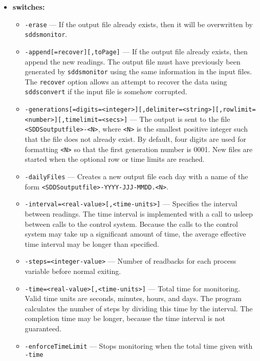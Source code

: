 \begin{itemize}
%
\item {\bf switches:}
%
%
    \begin{itemize}
        \item {\tt -erase} --- If the output file already exists, then it will be overwritten
                by \verb+sddsmonitor+.
        \item {\tt -append[=recover][,toPage]} --- If the output file already exists, then append the new readings.
                The output file must have previously been generated by \verb+sddsmonitor+ using the same
                information in the input files. The \verb+recover+ option allows an attempt
                to recover the data using \verb+sddsconvert+ if the input file is somehow corrupted.
        \item {\verb+-generations[=digits=<integer>][,delimiter=<string>][,rowlimit=<number>][,timelimit=<secs>]+} ---
                The output is sent to the file \verb+<SDDSoutputfile>-<N>+, where \verb+<N>+
                is the smallest positive integer such that the file does not already
                exist. By default, four digits are used for formatting \verb+<N>+ so that
                the first generation number is 0001. New files are started when the
                optional row or time limits are reached.
        \item {\tt -dailyFiles} --- Creates a new output file each day with a name
                of the form \verb+<SDDSoutputfile>-YYYY-JJJ-MMDD.<N>+.
        \item {\tt -interval=<real-value>[,<time-units>]} --- Specifies the interval between readings. The time
                interval is implemented with a call to usleep between calls to the control system.
                Because the calls to the control system may take up a significant amount of time, the average
                effective time interval may be longer than specified.
        \item {\tt -steps=<integer-value>} --- Number of readbacks for each process variable before normal exiting.
        \item {\tt -time=<real-value>[,<time-units>]} --- Total time for monitoring. Valid time units are
                seconds, minutes, hours, and days. The program calculates the number of steps by dividing this time
                by the interval. The completion time may be longer, because the time interval is not guaranteed.
        \item {\tt -enforceTimeLimit} --- Stops monitoring when the total time given with \verb+-time+

\end{itemize}
\end{itemize}
